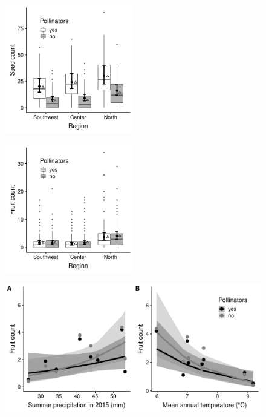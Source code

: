 \documentclass{article}
\begin{document}
{{{{{\clearpage


\begin{figure}[p]
\centering
\includegraphics[width = 0.5\textwidth]{figs/seeds_region}
\caption{}
\label{seedsregion}
\end{figure}


\clearpage


\begin{figure}[p]
\centering
\includegraphics[width = 0.5\textwidth]{figs/fruits_region}
\caption{}
\label{fruitsregion}
\end{figure}


\clearpage


\begin{figure}[p]
\centering
\includegraphics[width = \textwidth]{figs/fruit_climate}
\caption{}
\label{fruitsclimate}
\end{figure}


}}}}}
\end{document}
